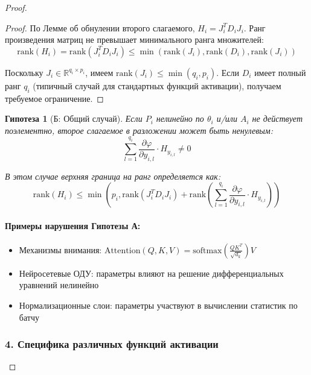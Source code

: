 \documentclass[a4paper,12pt]{article}
\newtheorem{hypothesis}{Гипотеза}
\begin{document}
\begin{proof}
    \begin{proof}
    По Лемме об обнулении второго слагаемого, $H_i = J_i^T D_i J_i$. Ранг произведения матриц не превышает минимального ранга множителей:
    \begin{equation}
    \text{rank}(H_i) = \text{rank}(J_i^T D_i J_i) \leq \min(\text{rank}(J_i), \text{rank}(D_i), \text{rank}(J_i))
    \end{equation}
    
    Поскольку $J_i \in \mathbb{R}^{q_i \times p_i}$, имеем $\text{rank}(J_i) \leq \min(q_i, p_i)$. Если $D_i$ имеет полный ранг $q_i$ (типичный случай для стандартных функций активации), получаем требуемое ограничение.
    \end{proof}
    
    \begin{hypothesis}[Б: Общий случай]
    Если $P_i$ нелинейно по $\theta_i$ и/или $A_i$ не действует поэлементно, второе слагаемое в разложении может быть ненулевым:
    \begin{equation}
    \sum_{l=1}^{q_i} \frac{\partial \varphi}{\partial y_{i,l}} \cdot H_{y_{i,l}} \neq 0
    \end{equation}
    
    В этом случае верхняя граница на ранг определяется как:
    \begin{equation}
    \text{rank}(H_i) \leq \min\left(p_i, \text{rank}(J_i^T D_i J_i) + \text{rank}\left(\sum_{l=1}^{q_i} \frac{\partial \varphi}{\partial y_{i,l}} \cdot H_{y_{i,l}}\right)\right)
    \end{equation}
    \end{hypothesis}
    
    \paragraph{Примеры нарушения Гипотезы А:}
    \begin{itemize}
    \item Механизмы внимания: $\text{Attention}(Q, K, V) = \text{softmax}\left(\frac{QK^T}{\sqrt{d_k}}\right)V$
    \item Нейросетевые ОДУ: параметры влияют на решение дифференциальных уравнений нелинейно
    \item Нормализационные слои: параметры участвуют в вычислении статистик по батчу
    \end{itemize}
    
    \subsubsection*{4. Специфика различных функций активации}
    

\end{proof}
\end{document}
